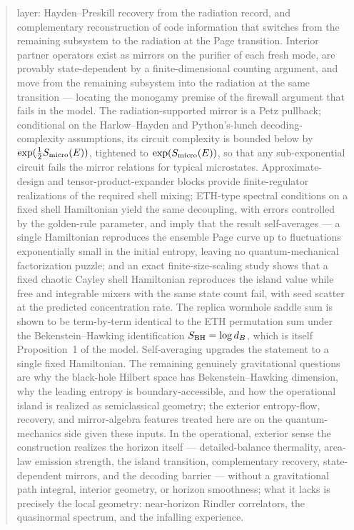\documentclass[12pt]{article}
\begin{document}
\begin{abstract}
layer: Hayden--Preskill recovery from the radiation record, and complementary
reconstruction of code information that switches from the remaining subsystem
to the radiation at the Page transition.  Interior partner operators exist
as mirrors on the purifier of each fresh mode, are provably state-dependent
by a finite-dimensional counting argument, and move from the remaining
subsystem into the radiation at the same transition --- locating the
monogamy premise of the firewall argument that fails in the model.
The radiation-supported mirror is a Petz pullback; conditional on the
Harlow--Hayden and Python's-lunch decoding-complexity assumptions, its
circuit complexity is bounded below by $\exp(\frac{1}{2}S_{\rm micro}(E))$,
tightened to $\exp(S_{\rm micro}(E))$, so that any sub-exponential
circuit fails the mirror relations for typical microstates.
Approximate-design and tensor-product-expander
blocks provide finite-regulator realizations of the required shell mixing;
ETH-type spectral conditions on a fixed shell Hamiltonian yield the same
decoupling, with errors controlled by the golden-rule parameter, and imply
that the result self-averages --- a single Hamiltonian reproduces the
ensemble Page curve up to fluctuations exponentially small in the initial
entropy, leaving no quantum-mechanical factorization puzzle;
and an exact finite-size-scaling study shows that a fixed chaotic Cayley
shell Hamiltonian reproduces the island value while free and integrable
mixers with the same state count fail, with seed scatter at the predicted
concentration rate.
The replica wormhole saddle sum is shown to be term-by-term identical to
the ETH permutation sum under the Bekenstein--Hawking identification
$S_{\rm BH}=\log d_B$, which is itself Proposition~1 of the model.
Self-averaging upgrades the statement to a single fixed Hamiltonian.
The remaining genuinely gravitational questions are why the black-hole
Hilbert space has Bekenstein--Hawking dimension, why the leading entropy
is boundary-accessible, and how the operational island is realized as
semiclassical geometry; the exterior entropy-flow, recovery, and
mirror-algebra features treated here are on the quantum-mechanics side
given these inputs.
In the operational, exterior sense the construction realizes the horizon
itself --- detailed-balance thermality, area-law emission strength, the
island transition, complementary recovery, state-dependent mirrors, and
the decoding barrier --- without a gravitational path integral, interior
geometry, or horizon smoothness; what it lacks is precisely the local
geometry: near-horizon Rindler correlators, the quasinormal spectrum, and
the infalling experience.
\end{abstract}
\end{document}
